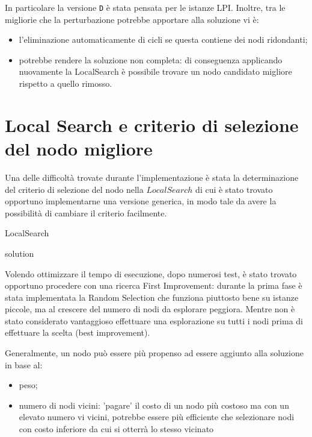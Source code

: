 \documentclass[11pt]{article}
\begin{document}
In particolare la versione \texttt{D} è stata pensata per le istanze LPI. Inoltre, tra le migliorie che la perturbazione potrebbe apportare alla soluzione vi è:
\begin{itemize}
\item{l'eliminazione automaticamente di cicli se questa contiene dei nodi ridondanti;}
\item{potrebbe rendere la soluzione non completa: di conseguenza applicando nuovamente la LocalSearch è possibile trovare un nodo candidato migliore rispetto a quello rimosso.}
\end{itemize}


\pagebreak

\section{Local Search e criterio di selezione del nodo migliore}

Una delle difficoltà trovate durante l'implementazione è stata la determinazione del criterio di selezione del nodo nella $LocalSearch$ di cui è stato trovato opportuno implementarne una versione generica, in modo tale da avere la possibilità di cambiare il criterio facilmente.

\begin{algorithm}
\caption{LocalSearch}
\begin{algorithmic}

\EndWhile
\State \Return solution
\end{algorithmic}
\end{algorithm}

Volendo ottimizzare il tempo di esecuzione, dopo numerosi test, è stato trovato opportuno procedere con una ricerca First Improvement: durante la prima fase è stata implementata la Random Selection che funziona piuttosto bene su istanze piccole, ma al crescere del numero di nodi da esplorare peggiora. Mentre non è stato considerato vantaggioso effettuare una esplorazione su tutti i nodi prima di effettuare la scelta (best improvement).

Generalmente, un nodo può essere più propenso ad essere aggiunto alla soluzione in base al:
\begin{itemize}
    \item {peso;}
    \item {numero di nodi vicini: 'pagare' il costo di un nodo più costoso ma con un elevato numero vi vicini, potrebbe essere più efficiente che selezionare nodi con costo inferiore da cui si otterrà lo stesso vicinato}
\end{itemize}
\end{document}
